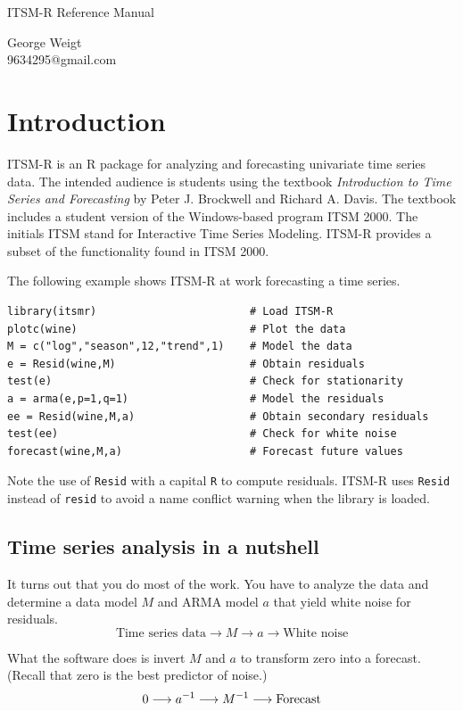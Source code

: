 \documentclass[12pt]{article}
\begin{document}
\begin{center}
{\LARGE ITSM-R Reference Manual}

\bigskip
George Weigt\\
9634295@gmail.com
\end{center}

\tableofcontents
\newpage

\section{Introduction}
ITSM-R is an R package for analyzing and forecasting univariate
time series data.
The intended audience is students using the textbook
{\it Introduction to Time Series and Forecasting}
by Peter J. Brockwell and Richard A. Davis.
The textbook includes a student version of the Windows-based program ITSM 2000.
The initials ITSM stand for Interactive Time Series Modeling.
ITSM-R provides a subset of the functionality found in ITSM 2000.

\bigskip
The following example shows ITSM-R at work forecasting a time series.

\begin{verbatim}
library(itsmr)                        # Load ITSM-R
plotc(wine)                           # Plot the data
M = c("log","season",12,"trend",1)    # Model the data
e = Resid(wine,M)                     # Obtain residuals
test(e)                               # Check for stationarity
a = arma(e,p=1,q=1)                   # Model the residuals
ee = Resid(wine,M,a)                  # Obtain secondary residuals
test(ee)                              # Check for white noise
forecast(wine,M,a)                    # Forecast future values
\end{verbatim}

Note the use of {\tt Resid} with a capital {\tt R} to compute residuals.
ITSM-R uses {\tt Resid} instead of {\tt resid} to avoid a name conflict
warning when the library is loaded.

\subsection{Time series analysis in a nutshell}
It turns out that you do most of the work.
You have to analyze the data and
determine a data model $M$ and ARMA model $a$
that yield white noise for residuals.
\[
\text{Time series data}
\longrightarrow M\longrightarrow a\longrightarrow
\text{White noise}
\]

What the software does is invert $M$ and $a$ to transform zero into a forecast.
(Recall that zero is the best predictor of noise.)
\[
0\longrightarrow a^{-1}\longrightarrow M^{-1}\longrightarrow{\rm Forecast}
\]
\end{document}
